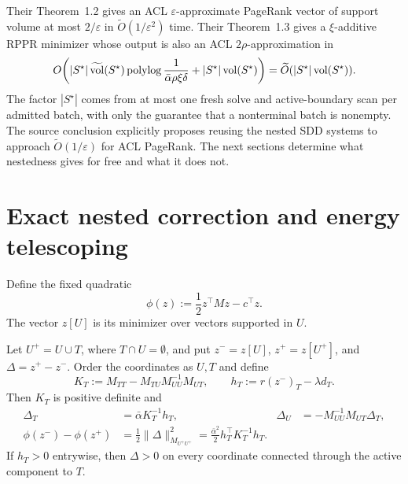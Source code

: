 \documentclass[11pt]{article}
\begin{document}
Their Theorem~1.2 gives an ACL $\varepsilon$-approximate PageRank vector of
support volume at most $2/\varepsilon$ in
$\widetilde O(1/\varepsilon^2)$ time.  Their Theorem~1.3 gives a
$\xi$-additive RPPR minimizer whose output is also an ACL
$2\rho$-approximation in
\begin{equation}
 O\!\left(
 |S^\star|\,\widetilde{\operatorname{vol}}(S^\star)
 \operatorname{polylog}\frac{1}{\bar\alpha\rho\xi\delta}
 +|S^\star|\operatorname{vol}(S^\star)
 \right)
 =\widetilde O(|S^\star|\operatorname{vol}(S^\star)).
 \label{eq:source-rppr-work}
\end{equation}
The factor $|S^\star|$ comes from at most one fresh solve and active-boundary
scan per admitted batch, with only the guarantee that a nonterminal batch is
nonempty.  The source conclusion explicitly proposes reusing the nested SDD
systems to approach $\widetilde O(1/\varepsilon)$ for ACL PageRank.  The next
sections determine what nestedness gives for free and what it does not.

\section{Exact nested correction and energy telescoping}
\label{sec:telescope}

Define the fixed quadratic
\begin{equation}
 \phi(z):=\frac12 z^\top Mz-c^\top z.
 \label{eq:fixed-quadratic}
\end{equation}
The vector $z[U]$ is its minimizer over vectors supported in $U$.

\begin{theorem}
\label{thm:block-schur}
Let $U^+=U\cup T$, where $T\cap U=\emptyset$, and put
$z^-=z[U]$, $z^+=z[U^+]$, and $\Delta=z^+-z^-$.  Order the coordinates as
$U,T$ and define
\begin{equation}
 K_T:=M_{TT}-M_{TU}M_{UU}^{-1}M_{UT},
 \qquad
 h_T:=r(z^-)_T-\lambda d_T.
 \label{eq:schur-data}
\end{equation}
Then $K_T$ is positive definite and
\begin{align}
 \Delta_T&=\bar\alpha K_T^{-1}h_T,
 &
 \Delta_U&=-M_{UU}^{-1}M_{UT}\Delta_T,
 \label{eq:block-correction}\\
 \phi(z^-)-\phi(z^+)
 &=\frac12\|\Delta\|_{M_{U^+U^+}}^2
 =\frac{\bar\alpha^2}{2}h_T^\top K_T^{-1}h_T.
 \label{eq:block-energy}
\end{align}
If $h_T>0$ entrywise, then $\Delta>0$ on every coordinate connected through
the active component to $T$.
\end{theorem}
\end{document}
